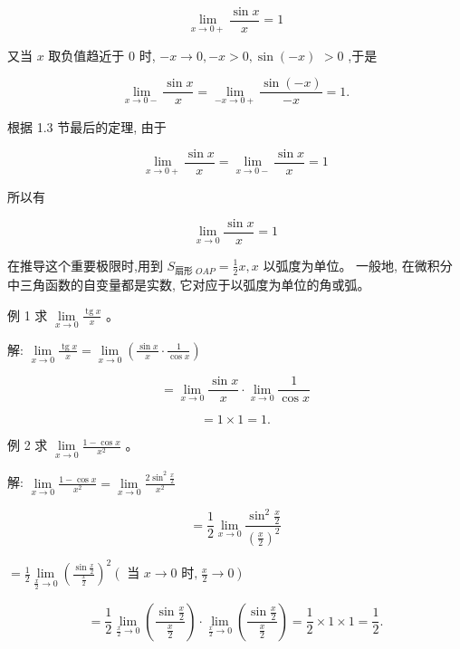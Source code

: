 \documentclass[lang=cn,newtx,12pt,scheme=chinese]{elegantbook}
\begin{document}
\[
\mathop{\lim }\limits_{{x \rightarrow 0 + }}\frac{\sin x}{x} = 1
\]

又当 \(x\) 取负值趋近于 0 时, \(- x \rightarrow 0, - x > 0,\sin \left( {-x}\right)\) \(> 0\) ,于是

\[
\mathop{\lim }\limits_{{x \rightarrow 0 - }}\frac{\sin x}{x} = \mathop{\lim }\limits_{{-x \rightarrow 0 + }}\frac{\sin \left( {-x}\right) }{-x} = 1.
\]

根据 1.3 节最后的定理, 由于

\[
\mathop{\lim }\limits_{{x \rightarrow 0 + }}\frac{\sin x}{x} = \mathop{\lim }\limits_{{x \rightarrow 0 - }}\frac{\sin x}{x} = 1
\]

所以有

\[
\mathop{\lim }\limits_{{x \rightarrow 0}}\frac{\sin x}{x} = 1
\]

在推导这个重要极限时,用到 \({S}_{\text{扇形 }{OAP}} = \frac{1}{2}x,x\) 以弧度为单位。 一般地, 在微积分中三角函数的自变量都是实数, 它对应于以弧度为单位的角或弧。

例 1 求 \(\mathop{\lim }\limits_{{x \rightarrow 0}}\frac{\operatorname{tg}x}{x}\) 。

解: \(\mathop{\lim }\limits_{{x \rightarrow 0}}\frac{\operatorname{tg}x}{x} = \mathop{\lim }\limits_{{x \rightarrow 0}}\left( {\frac{\sin x}{x} \cdot \frac{1}{\cos x}}\right)\)

\[
= \mathop{\lim }\limits_{{x \rightarrow 0}}\frac{\sin x}{x} \cdot \mathop{\lim }\limits_{{x \rightarrow 0}}\frac{1}{\cos x}
\]

\[
= 1 \times 1 = 1\text{.}
\]

例 2 求 \(\mathop{\lim }\limits_{{x \rightarrow 0}}\frac{1 - \cos x}{{x}^{2}}\) 。

解: \(\mathop{\lim }\limits_{{x \rightarrow 0}}\frac{1 - \cos x}{{x}^{2}} = \mathop{\lim }\limits_{{x \rightarrow 0}}\frac{2{\sin }^{2}\frac{x}{2}}{{x}^{2}}\)

\[
= \frac{1}{2}\mathop{\lim }\limits_{{x \rightarrow 0}}\frac{{\sin }^{2}\frac{x}{2}}{{\left( \frac{x}{2}\right) }^{2}}
\]

\(= \frac{1}{2}\mathop{\lim }\limits_{{\frac{x}{2} \rightarrow 0}}{\left( \frac{\sin \frac{x}{2}}{\frac{x}{2}}\right) }^{2}\left( {\text{ 当 }x \rightarrow 0\text{ 时,}\;\frac{x}{2} \rightarrow 0}\right)\)

\[
= \frac{1}{2}\mathop{\lim }\limits_{{\frac{x}{2} \rightarrow 0}}\left( \frac{\sin \frac{x}{2}}{\frac{x}{2}}\right) \cdot \mathop{\lim }\limits_{{\frac{x}{2} \rightarrow 0}}\left( \frac{\sin \frac{x}{2}}{\frac{x}{2}}\right) = \frac{1}{2} \times 1 \times 1 = \frac{1}{2}\text{.}
\]
\end{document}
